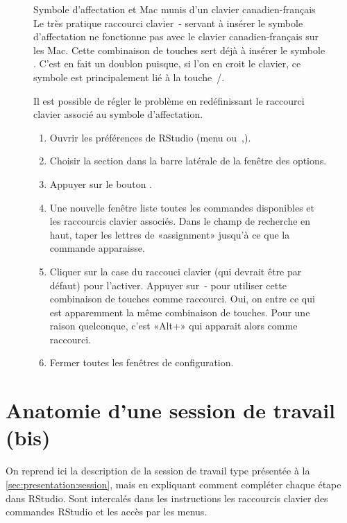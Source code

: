 \begin{figure}[t]
  \begin{emphbox}{\mdseries Symbole d'affectation et
      Mac munis d'un clavier canadien-français}
    Le très pratique raccourci clavier {\optkey\,-} servant à insérer
    le symbole d'affectation ne fonctionne pas avec le clavier
    canadien-français sur les Mac. Cette combinaison de touches sert
    déjà à insérer le symbole \textbar. C'est en fait un doublon
    puisque, si l'on en croit le clavier, ce symbole est
    principalement lié à la
    touche {\optkey\,/}.

    Il est possible de régler le problème en redéfinissant le raccourci
    clavier associé au symbole d'affectation.

    \begin{enumerate}
    \item Ouvrir les préférences de RStudio (menu
       ou {\cmdkey\,,}).
    \item Choisir la section  dans la barre latérale de la
      fenêtre des options.
    \item Appuyer sur le bouton .
    \item Une nouvelle fenêtre liste toutes les commandes disponibles
      et les raccourcis clavier associés. Dans le champ de recherche en
      haut, taper les lettres de «assignment» jusqu'à ce que la
      commande  apparaisse.
    \item Cliquer sur la case du raccouci clavier (qui devrait être
       par défaut) pour l'activer. Appuyer sur \optkey\,-
      pour utiliser cette combinaison de touches comme raccourci. Oui,
      on entre ce qui est apparemment la même combinaison de touches.
      Pour une raison quelconque, c'est «Alt+\bs» qui apparait alors
      comme raccourci.
    \item Fermer toutes les fenêtres de configuration.
    \end{enumerate}
  \end{emphbox}
  \label{fig:rstudio:affectation}
\end{figure}

\section{Anatomie d'une session de travail (bis)}
\label{sec:rstudio:session}

On reprend ici la description de %
la session de travail %
type présentée à la \autoref{sec:presentation:session}, mais en
expliquant comment compléter chaque étape dans RStudio. Sont
intercalés dans les instructions les raccourcis clavier des commandes
RStudio et les accès par les menus.

